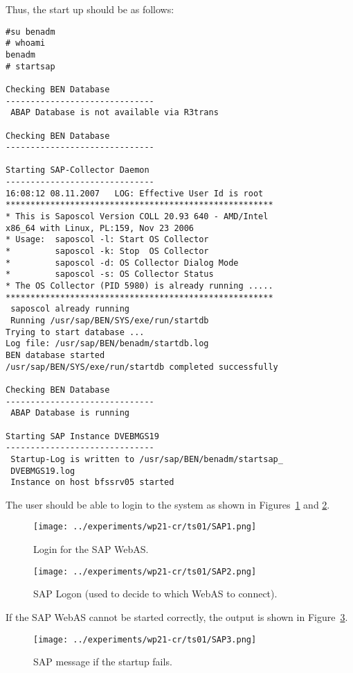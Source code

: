 Thus, the start up should be as follows:
\begin{lstlisting}
#su benadm
# whoami
benadm
# startsap

Checking BEN Database
------------------------------
 ABAP Database is not available via R3trans

Checking BEN Database
------------------------------

Starting SAP-Collector Daemon
------------------------------
16:08:12 08.11.2007   LOG: Effective User Id is root
******************************************************
* This is Saposcol Version COLL 20.93 640 - AMD/Intel 
x86_64 with Linux, PL:159, Nov 23 2006
* Usage:  saposcol -l: Start OS Collector
*         saposcol -k: Stop  OS Collector
*         saposcol -d: OS Collector Dialog Mode
*         saposcol -s: OS Collector Status
* The OS Collector (PID 5980) is already running .....
******************************************************
 saposcol already running
 Running /usr/sap/BEN/SYS/exe/run/startdb
Trying to start database ...
Log file: /usr/sap/BEN/benadm/startdb.log
BEN database started
/usr/sap/BEN/SYS/exe/run/startdb completed successfully

Checking BEN Database
------------------------------
 ABAP Database is running

Starting SAP Instance DVEBMGS19
------------------------------
 Startup-Log is written to /usr/sap/BEN/benadm/startsap_
 DVEBMGS19.log
 Instance on host bfssrv05 started
\end{lstlisting}
The user should be able to login to the system as shown in Figures~\ref{fig:SAP1} and \ref{fig:SAP2}.

\begin{figure}[h!]
    \centerline{\texttt{[image: ../experiments/wp21-cr/ts01/SAP1.png]}}
    \caption{\label{fig:SAP1}Login for the SAP WebAS.}
\end{figure}
\begin{figure}[h!]
    \centerline{\texttt{[image: ../experiments/wp21-cr/ts01/SAP2.png]}}
    \caption{\label{fig:SAP2}SAP Logon (used to decide to which WebAS to connect).}
\end{figure}

If the SAP WebAS cannot be started correctly, the output is shown in Figure~\ref{fig:SAP3}.
\begin{figure}[h!]
    \centerline{\texttt{[image: ../experiments/wp21-cr/ts01/SAP3.png]}}
    \caption{\label{fig:SAP3}SAP message if the startup fails.}
\end{figure}

